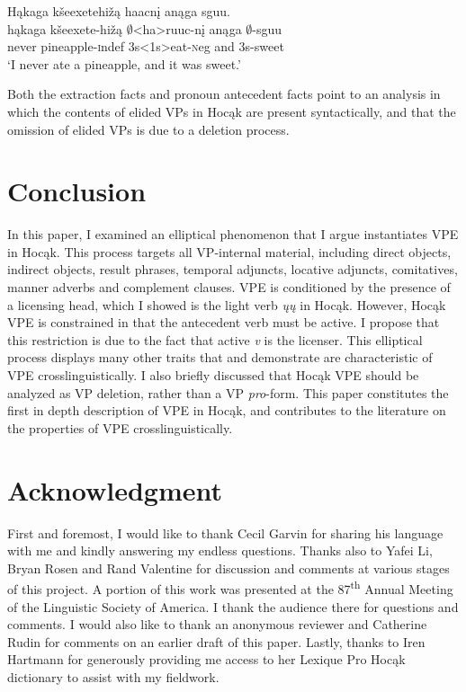 \documentclass[output=paper]{LSP/langsci}
\begin{document}
\ea\label{ex:johnson:52} 
\glll Hąkaga kšeexetehižą haacnį anąga sguu.\\
hąkaga kšeexete-hižą $\emptyset$<ha>ruuc-nį anąga $\emptyset$-sguu\\
never pineapple-{\textsc indef} {\textsc 3s<1s>}eat-{\textsc neg} and {\textsc 3s}-sweet\\
\trans `I never ate a pineapple, and it was sweet.'
\z


Both the extraction facts and pronoun antecedent facts point to an analysis in which the contents of elided VPs in Hocąk are present syntactically, and that the omission of elided VPs is due to a deletion process.

\section{Conclusion}\label{sec:johnson:5}

In this paper, I examined an elliptical phenomenon that I argue instantiates VPE in Hocąk. This process targets all VP-internal material, including direct objects, indirect objects, result phrases, temporal adjuncts, locative adjuncts, comitatives, manner adverbs and complement clauses. VPE is conditioned by the presence of a licensing head, which I showed is the light verb \emph{ųų} in Hocąk. However, Hocąk VPE is constrained in that the antecedent verb must be active. I propose that this restriction is due to the fact that active \emph{v} is the licenser. This elliptical process displays many other traits that \citet{Goldberg2005} and \citet{Fortin2007} demonstrate are characteristic of VPE crosslinguistically. I also briefly discussed that Hocąk VPE should be analyzed as VP deletion, rather than a VP \emph{pro}-form. This paper constitutes the first in depth description of VPE in Hocąk, and contributes to the literature on the properties of VPE crosslinguistically. 

\section*{Acknowledgment}

First and foremost, I would like to thank Cecil Garvin for sharing his language with me and kindly answering my endless questions. Thanks also to Yafei Li, Bryan Rosen and Rand Valentine for discussion and comments at various stages of this project. A portion of this work was presented at the 87\textsuperscript{th} Annual Meeting of the Linguistic Society of America. I thank the audience there for questions and comments. I would also like to thank an anonymous reviewer and Catherine Rudin for comments on an earlier draft of this paper. Lastly, thanks to Iren Hartmann for generously providing me access to her Lexique Pro Hocąk dictionary to assist with my fieldwork.
\end{document}
